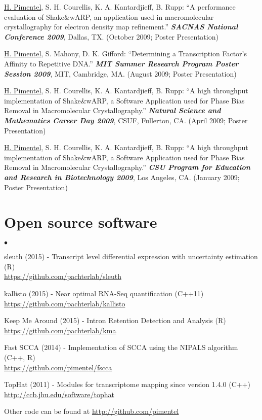 \documentclass[margin,line]{res}
\newenvironment{list2}{
  \begin{list}{$\bullet$}{%
      \setlength{\itemsep}{0in}
      \setlength{\parsep}{0in} \setlength{\parskip}{0in}
      \setlength{\topsep}{0in} \setlength{\partopsep}{0in}
      \setlength{\leftmargin}{0.2in}}}{\end{list}}
\begin{document}
\begin{resume}
\underline{H. Pimentel}, S. H. Courellis, K. A. Kantardjieff, B. Rupp: ``A
performance evaluation of Shake\&wARP, an application used in macromolecular
crystallography for electron density map refinement.''  {\bf \emph{SACNAS
    National Conference 2009}}, Dallas, TX. (October 2009; Poster Presentation)

\underline{H. Pimentel}, S. Mahony, D. K. Gifford: ``Determining a
Transcription Factor's Affinity to Repetitive DNA.'' {\bf \emph{MIT
    Summer Research Program Poster Session 2009}}, MIT, Cambridge,
MA. (August 2009; Poster Presentation)

\underline{H. Pimentel}, S. H. Courellis, K. A. Kantardjieff, B. Rupp: ``A high
throughput implementation of Shake\&wARP, a Software Application used for Phase
Bias Removal in Macromolecular Crystallography.'' {\bf \emph{Natural Science and
    Mathematics Career Day 2009}}, CSUF, Fullerton, CA. (April 2009; Poster
Presentation)

\underline{H. Pimentel}, S. H. Courellis, K. A. Kantardjieff, B. Rupp:
``A high throughput implementation of Shake\&wARP, a Software
Application used for Phase Bias Removal in Macromolecular
Crystallography.'' {\bf \emph{CSU Program for Education and Research
   in Biotechnology 2009}}, Los Angeles, CA. (January 2009; Poster Presentation)

\newpage

\section{\sc Open source software}

\begin{list2}
  \item sleuth (2015) - Transcript level differential expression with uncertainty estimation (R)\\
    \url{https://github.com/pachterlab/sleuth}
  \item kallisto (2015) - Near optimal RNA-Seq quantification (C++11)\\
    \url{https://github.com/pachterlab/kallisto}
  \item Keep Me Around (2015) - Intron Retention Detection and Analysis (R) \\
    \url{https://github.com/pachterlab/kma}
  \item Fast SCCA (2014) - Implementation of SCCA using the NIPALS algorithm (C++, R) \\
    \url{https://github.com/pimentel/fscca}
  \item TopHat (2011) - Modules for transcriptome mapping since version 1.4.0 (C++) \\
    \url{http://ccb.jhu.edu/software/tophat}
  \item Other code can be found at \url{http://github.com/pimentel}
\end{list2}


\end{resume}
\end{document}
